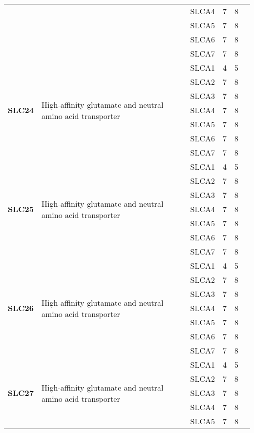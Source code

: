 \documentclass[12pt]{report}
\begin{document}
\begin{center}
\begin{longtable}{|p{1.5cm}|p{3.2cm}|p{1.9cm}|p{1.65cm}|p{3cm}|p{3cm}|}
\cline{3-6}
&&SLCA4&7 & 8&\\ 
\cline{3-6}
&&SLCA5&7 & 8&\\ 
\cline{3-6}
&&SLCA6&7 & 8&\\ 
\cline{3-6}
&&SLCA7&7 & 8&\\ 
\hline
\multirow{7}{1.5cm}{\textbf{SLC24}} & \multirow{7}{4cm}{High-affinity glutamate and neutral amino acid transporter} & SLCA1 & 4 & 5\\ 
\cline{3-6}
&&SLCA2&7 & 8&\\ 
\cline{3-6}
&&SLCA3&7 & 8&\\ 
\cline{3-6}
&&SLCA4&7 & 8&\\ 
\cline{3-6}
&&SLCA5&7 & 8&\\ 
\cline{3-6}
&&SLCA6&7 & 8&\\ 
\cline{3-6}
&&SLCA7&7 & 8&\\ 
\hline
\multirow{7}{1.5cm}{\textbf{SLC25}} & \multirow{7}{4cm}{High-affinity glutamate and neutral amino acid transporter} & SLCA1 & 4 & 5\\ 
\cline{3-6}
&&SLCA2&7 & 8&\\ 
\cline{3-6}
&&SLCA3&7 & 8&\\ 
\cline{3-6}
&&SLCA4&7 & 8&\\ 
\cline{3-6}
&&SLCA5&7 & 8&\\ 
\cline{3-6}
&&SLCA6&7 & 8&\\ 
\cline{3-6}
&&SLCA7&7 & 8&\\ 
\hline
\multirow{7}{1.5cm}{\textbf{SLC26}} & \multirow{7}{4cm}{High-affinity glutamate and neutral amino acid transporter} & SLCA1 & 4 & 5\\ 
\cline{3-6}
&&SLCA2&7 & 8&\\ 
\cline{3-6}
&&SLCA3&7 & 8&\\ 
\cline{3-6}
&&SLCA4&7 & 8&\\ 
\cline{3-6}
&&SLCA5&7 & 8&\\ 
\cline{3-6}
&&SLCA6&7 & 8&\\ 
\cline{3-6}
&&SLCA7&7 & 8&\\ 
\hline
\multirow{7}{1.5cm}{\textbf{SLC27}} & \multirow{7}{4cm}{High-affinity glutamate and neutral amino acid transporter} & SLCA1 & 4 & 5\\ 
\cline{3-6}
&&SLCA2&7 & 8&\\ 
\cline{3-6}
&&SLCA3&7 & 8&\\ 
\cline{3-6}
&&SLCA4&7 & 8&\\ 
\cline{3-6}
&&SLCA5&7 & 8&\\ 

\end{longtable}
\end{center}
\end{document}
